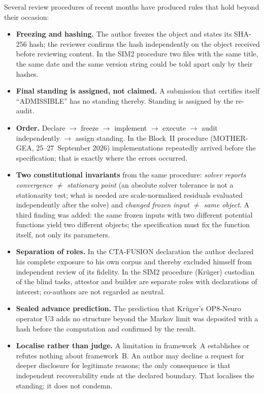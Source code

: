 Several review procedures of recent months have produced rules that hold beyond their
occasion:
\begin{itemize}
\item \textbf{Freezing and hashing.} The author freezes the object and states its SHA-256
  hash; the reviewer confirms the hash independently on the object received before
  reviewing content. In the SIM2 procedure two files with the same title, the same date and
  the same version string could be told apart only by their hashes.
\item \textbf{Final standing is assigned, not claimed.} A submission that certifies itself
  ``ADMISSIBLE'' has no standing thereby. Standing is assigned by the re-audit.
\item \textbf{Order.} Declare $\to$ freeze $\to$ implement $\to$ execute $\to$ audit
  independently $\to$ assign standing. In the Block~II procedure (MOTHER-GEA,
  25--27~September 2026) implementations repeatedly arrived before the specification;
  that is exactly where the errors occurred.
\item \textbf{Two constitutional invariants} from the same procedure: \emph{solver reports
  convergence $\neq$ stationary point} (an absolute solver tolerance is not a stationarity
  test; what is needed are scale-normalised residuals evaluated independently after the
  solve) and \emph{changed frozen input $\neq$ same object}. A third finding was added: the
  same frozen inputs with two different potential functions yield two different objects;
  the specification must fix the function itself, not only its parameters.
\item \textbf{Separation of roles.} In the CTA-FUSION declaration the author declared his
  complete exposure to his own corpus and thereby excluded himself from independent review
  of its fidelity. In the SIM2 procedure (Krüger) custodian of the blind tasks, attestor and
  builder are separate roles with declarations of interest; co-authors are not regarded as
  neutral.
\item \textbf{Sealed advance prediction.} The prediction that Krüger's OP8-Neuro operator U3
  adds no structure beyond the Markov limit was deposited with a hash before the
  computation and confirmed by the result.
\item \textbf{Localise rather than judge.} A limitation in framework~A establishes or refutes
  nothing about framework~B. An author may decline a request for deeper disclosure for
  legitimate reasons; the only consequence is that independent recoverability ends at the
  declared boundary. That localises the standing; it does not condemn.
\end{itemize}

